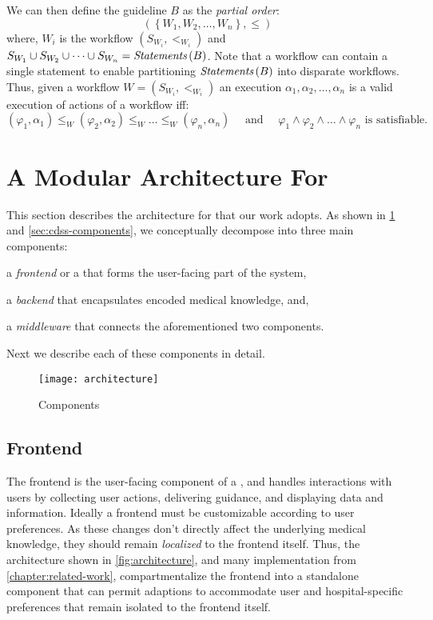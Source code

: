 We can then define the guideline $B$ as the \emph{partial order}:
\[
  \left(\left\{W_1,W_2,\dots,W_n\right\}, \leq\right)
\]
where, $W_i$ is the workflow $\left(S_{W_i}, <_{W_i}\right)$ and
$S_{W_1} \cup S_{W_2} \cup \dots \cup S_{W_n} = \textit{Statements}\left(B\right)$. Note that a
workflow can contain a single statement to enable partitioning $\textit{Statements}\left(B\right)$
into disparate workflows. Thus, given a workflow $W =\left(S_{W_i},
    <_{W_i}\right)$  an execution
$\alpha_1,\alpha_2,\dots,\alpha_n$ is a valid execution of actions of a workflow
iff:
\[
  \left(\varphi_1,\alpha_1\right) \leq_W \left(\varphi_2,\alpha_2\right) \leq_W \dots \leq_W \left(\varphi_n,\alpha_n\right)
  \quad\text{ and }\quad
  \varphi_1 \wedge \varphi_2 \wedge \dots \wedge \varphi_n \text{ is satisfiable.}
\]

\section{A Modular Architecture For \CDSSs{}}\label{sec:modular-cdss-architecture}
This section describes the architecture for \CDSSs{}
that our work adopts. As shown in \figurename{} \ref{fig:architecture}
and \autoref{sec:cdss-components}, we conceptually
decompose \CDSSs{} into three main components:
\begin{enumerate*}[label=(\roman*)]
    \item a \emph{frontend} or a \UI{} that forms the user-facing part of the system,
    \item a \emph{backend} that encapsulates encoded medical knowledge, and,
    \item a \emph{middleware} that connects the aforementioned two components.
\end{enumerate*}
Next we describe each of these components in detail.

\begin{figure}[t]
\centering
\texttt{[image: architecture]}
\caption{\CDSSs{} Components}\label{fig:architecture}
\end{figure}


\subsection{Frontend}\label{sec:frontend}

The frontend is the user-facing component of a \CDSS{}, and
handles interactions with users by collecting user actions,
delivering guidance, and displaying data and information.
Ideally a \CDSS{} frontend must be customizable according to
user preferences. As these changes don't directly
affect the underlying medical knowledge, they should remain
\emph{localized} to the frontend itself.
Thus, the architecture shown in \autoref{fig:architecture},
and many implementation from \autoref{chapter:related-work},
compartmentalize the frontend into a standalone component that
can permit adaptions to accommodate user and hospital-specific
preferences that remain isolated to the frontend itself.

